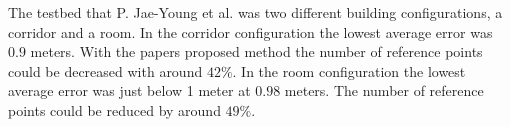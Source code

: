 \bigskip

The testbed that P. Jae-Young et al. was two different building configurations, a corridor and a room.
In the corridor configuration the lowest average error was $0.9$ meters. 
With the papers proposed method the number of reference points could be decreased with around $42\%$.
In the room configuration the lowest average error was just below 1 meter at $0.98$ meters.
The number of reference points could be reduced by around $49\%$.
